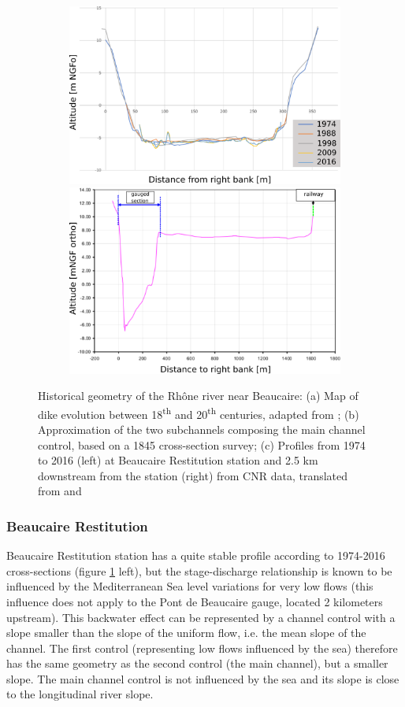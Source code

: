 \documentclass[11pt]{article}
\begin{document}
\begin{figure}[h!]
            \begin{subfigure}{.9\linewidth}
            \includegraphics[width=.48\linewidth]{Figs/3c-ProfilsBardRestit.png}
            \includegraphics[width=.48\linewidth]{Figs/3c-ProfilAvalRestitEN.png}
            \caption{}
            \label{subfig:avalprofilesRestit}
            \end{subfigure}
            
            \caption{Historical geometry of the Rhône river near Beaucaire: (a) Map of dike evolution between 18\textsuperscript{th} and 20\textsuperscript{th} centuries, adapted from \citet{armand_ii_1907}; (b) Approximation of the two subchannels composing the main channel control, based on a 1845 cross-section survey; (c) Profiles from 1974 to 2016 (left) at Beaucaire Restitution station and 2.5 km downstream from the station (right) from CNR data, translated from \citet{bard_actualisation_2018} and \citet{medd_debit_2005}}
            \label{fig:groupPriorPt}
        \end{figure}


        \subsubsection{Beaucaire Restitution}
        
        Beaucaire Restitution station has a quite stable profile according to 1974-2016 cross-sections (figure \ref{subfig:avalprofilesRestit} left), but the stage-discharge relationship is known to be influenced by the Mediterranean Sea level variations for very low flows (this influence does not apply to the Pont de Beaucaire gauge, located 2 kilometers upstream). This backwater effect can be represented by a channel control with a slope smaller than the slope of the uniform flow, i.e. the mean slope of the channel. The first control (representing low flows influenced by the sea) therefore has the same geometry as the second control (the main channel), but a smaller slope. The main channel control is not influenced by the sea and its slope is close to the longitudinal river slope. 
\end{document}
